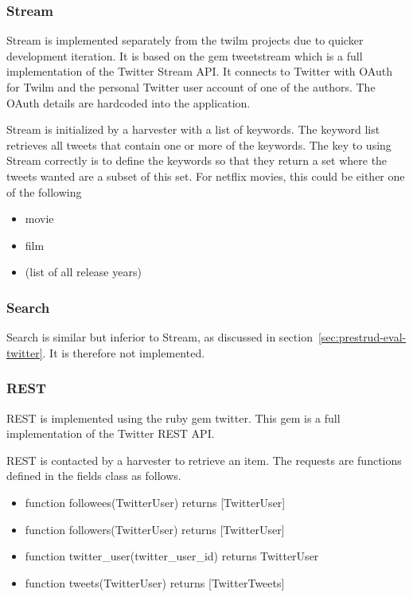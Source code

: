 \subsubsection{Stream}
Stream is implemented separately from the twilm projects due to quicker development iteration. It is based on the gem tweetstream which is a full implementation of the Twitter Stream API. It connects to Twitter with OAuth for Twilm and the personal Twitter user account of one of the authors. The OAuth details are hardcoded into the application.

Stream is initialized by a harvester with a list of keywords. The keyword list retrieves all tweets that contain one or more of the keywords. The key to using Stream correctly is to define the keywords so that they return a set where the tweets wanted are a subset of this set. For netflix movies, this could be either one of the following

	\begin{itemize}
	\item movie
	\item film
	\item (list of all release years)
	\end{itemize}

\subsubsection{Search}
Search is similar but inferior to Stream, as discussed in section~\ref{sec:prestrud-eval-twitter}. It is therefore not implemented.

\subsubsection{REST}
REST is implemented using the ruby gem twitter. This gem is a full implementation of the Twitter REST API.

REST is contacted by a harvester to retrieve an item. The requests are functions defined in the fields class as follows.

	\begin{itemize}
	\item function followees(TwitterUser) returns [TwitterUser]
	\item function followers(TwitterUser) returns [TwitterUser]
	\item function twitter\_user(twitter\_user\_id) returns TwitterUser
	\item function tweets(TwitterUser) returns [TwitterTweets]
	\end{itemize}

